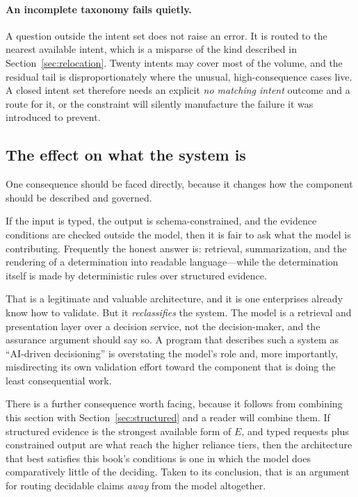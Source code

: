 \paragraph{An incomplete taxonomy fails quietly.} A question outside the intent set
does not raise an error. It is routed to the nearest available intent, which is a
misparse of the kind described in Section~\ref{sec:relocation}. Twenty intents may
cover most of the volume, and the residual tail is disproportionately where the
unusual, high-consequence cases live. A closed intent set therefore needs an explicit
\emph{no matching intent} outcome and a route for it, or the constraint will silently
manufacture the failure it was introduced to prevent.

\subsection{The effect on what the system is}

One consequence should be faced directly, because it changes how the component should
be described and governed.

If the input is typed, the output is schema-constrained, and the evidence conditions
are checked outside the model, then it is fair to ask what the model is contributing.
Frequently the honest answer is: retrieval, summarization, and the rendering of a
determination into readable language---while the determination itself is made by
deterministic rules over structured evidence.

That is a legitimate and valuable architecture, and it is one enterprises already know
how to validate. But it \emph{reclassifies} the system. The model is a retrieval and
presentation layer over a decision service, not the decision-maker, and the assurance
argument should say so. A program that describes such a system as ``AI-driven
decisioning'' is overstating the model's role and, more importantly, misdirecting its
own validation effort toward the component that is doing the least consequential work.

There is a further consequence worth facing, because it follows from combining this
section with Section~\ref{sec:structured} and a reader will combine them. If structured
evidence is the strongest available form of $E$, and typed requests plus constrained
output are what reach the higher reliance tiers, then the architecture that best
satisfies this book's conditions is one in which the model does comparatively little of
the deciding. Taken to its conclusion, that is an argument for routing decidable claims
\emph{away} from the model altogether.

